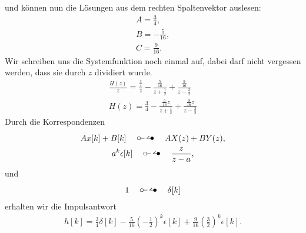 \documentclass[11pt,a4paper,DIV=12]{scrartcl}
\begin{document}
und können nun die Lösungen aus dem rechten Spaltenvektor auslesen:
\begin{gather}
	A=\frac{3}{4},\\
	B=-\frac{5}{16},\\
	C=\frac{9}{16}.
\end{gather}
Wir schreiben uns die Systemfunktion noch einmal auf, dabei darf nicht vergessen werden, dass sie durch $z$ dividiert wurde.
\begin{gather}
	\frac{H(z)}{z}=\frac{\frac{3}{4}}{z} - \frac{\frac{5}{16}}{z+\frac{1}{2}} + \frac{\frac{9}{16}}{z-\frac{3}{2}}\\
	H(z) =\frac{3}{4} - \frac{\frac{5}{16} z}{z+\frac{1}{2}} + \frac{\frac{9}{16} z}{z-\frac{3}{2}}
\end{gather}
Durch die Korrespondenzen
\begin{gather}
	Ax[k]+B[k]\quad\ztransf\quad AX(z)+BY(z),\\
	a^k\epsilon[k]\quad\ztransf\quad \frac{z}{z-a},
\end{gather}
und
\begin{gather}
	1\quad\ztransf\quad \delta[k]
\end{gather}
erhalten wir die Impulsantwort
\begin{gather}
	h[k] = \frac{3}{4} \delta[k] - \frac{5}{16}\left(-\frac{1}{2}\right)^k \epsilon[k] + \frac{9}{16}\left(\frac{3}{2}\right)^k \epsilon[k].
\end{gather}

\newpage
\end{document}
